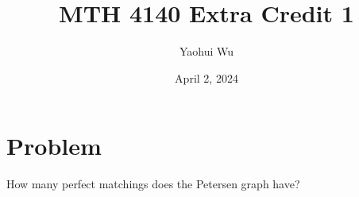 \documentclass[12pt]{article}
\title{MTH 4140 Extra Credit 1}
\author{Yaohui Wu}
\date{April 2, 2024}
\begin{document}
\maketitle
\section*{Problem}
How many perfect matchings does the Petersen graph have?
\end{document}
